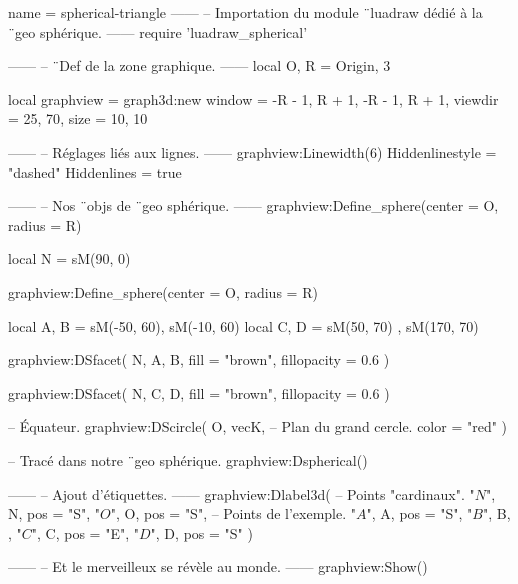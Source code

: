 \documentclass{standalone}
\begin{document}
\begin{luadraw}{name = spherical-triangle}
------
-- Importation du module ¨luadraw dédié à la ¨geo sphérique.
------
require 'luadraw_spherical'

------
-- ¨Def de la zone graphique.
------
local O, R = Origin, 3

local graphview = graph3d:new{
  window  = {-R - 1, R + 1, -R - 1, R + 1},
  viewdir = {25, 70},
  size    = {10, 10}
}

------
-- Réglages liés aux lignes.
------
graphview:Linewidth(6)
Hiddenlinestyle = "dashed"
Hiddenlines     = true

------
-- Nos ¨objs de ¨geo sphérique.
------
graphview:Define_sphere({center = O, radius = R})

local N = sM(90, 0)

graphview:Define_sphere({center = O, radius = R})

local A, B = sM(-50, 60), sM(-10, 60)
local C, D = sM(50, 70) , sM(170, 70)

graphview:DSfacet(
  {N, A, B},
  {fill = "brown", fillopacity = 0.6}
)

graphview:DSfacet(
  {N, C, D},
  {fill = "brown", fillopacity = 0.6}
)

-- Équateur.
graphview:DScircle(
  {O, vecK},       -- Plan du grand cercle.
  {color = "red"}
)

-- Tracé dans notre ¨geo sphérique.
graphview:Dspherical()

------
-- Ajout d'étiquettes.
------
graphview:Dlabel3d(
-- Points "cardinaux".
  "$N$", N, {pos = "S"},
  "$O$", O, {pos = "S"},
-- Points de l'exemple.
  "$A$", A, {pos = "S"},
  "$B$", B, {},
  "$C$", C, {pos = "E"},
  "$D$", D, {pos = "S"}
)

------
-- Et le merveilleux se révèle au monde.
------
graphview:Show()
\end{luadraw}
\end{document}
